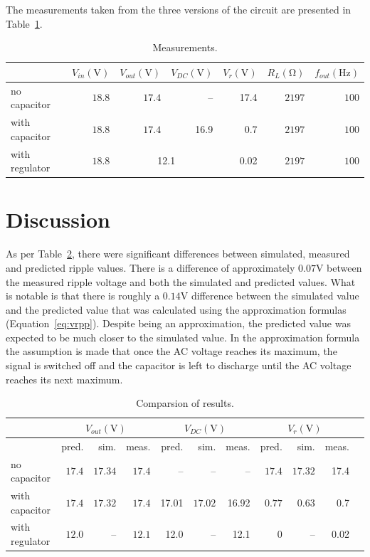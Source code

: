 \documentclass[12pt]{article}
\begin{document}
The measurements taken from the three versions of the circuit are presented in Table~\ref{tab:imp}.
\begin{table}[h!]
\centering
\caption{Measurements.}  
\begin{tabular}{|l|r|r|r|r|r|r|}
\hline
&$V_{in}(\mathrm{V})$&$V_{out}(\mathrm{V})$&$V_{DC}(\mathrm{V})$&$V_{r}(\mathrm{V})$&$R_{L}(\mathrm{\Omega})$&$f_{out}(\mathrm{Hz})$\\ \hline
no capacitor&$18.8$&$17.4$&--&17.4&$2197$&$100$\\ \hline
with capacitor&$18.8$&$17.4$&16.9&0.7&$2197$&$100$\\ \hline
with regulator&$18.8$&\multicolumn{2}{|c|}{12.1}&0.02&$2197$&$100$\\ \hline
\end{tabular}
\label{tab:imp}
\end{table}

\section{Discussion}
\label{sec:dis}
As per Table~\ref{tab:dis}, there were significant differences between simulated, measured and predicted ripple values. There is a difference of approximately $0.07\mathrm{V}$ between the measured ripple voltage and both the simulated and predicted values. What is notable is that there is roughly a $0.14\mathrm{V}$ difference between the simulated value and the predicted value that was calculated using the approximation formulas (Equation~\ref{eq:vrpp}). Despite being an approximation, the predicted value was expected to be much closer to the simulated value. In the approximation formula the assumption is made that once the AC voltage reaches its maximum, the signal is switched off and the capacitor is left to discharge until the AC voltage reaches its next maximum.
\begin{table}[h!]
\centering
\caption{Comparsion of results.}  
\begin{tabular}{|l|r|r|r|r|r|r|r|r|r|r|}
\hline
&\multicolumn{3}{|c|}{$V_{out}(\mathrm{V})$}&\multicolumn{3}{|c|}{$V_{DC}(\mathrm{V})$}&\multicolumn{3}{|c|}{$V_{r}(\mathrm{V})$}\\ \hline
&pred.&sim.&meas.&pred.&sim.&meas.&pred.&sim.&meas.\\ \hline
no capacitor&$17.4$&$17.34$&$17.4$&--&--&--&$17.4$&$17.32$&17.4\\ \hline
with capacitor&$17.4$&$17.32$&$17.4$&17.01&$17.02$&16.92&$0.77$&$0.63$&0.7\\ \hline
with regulator&$12.0$&--&$12.1$&12.0&--&12.1&$0$&--&0.02\\ \hline
\end{tabular}
\label{tab:dis}
\end{table}
 
\end{document}
